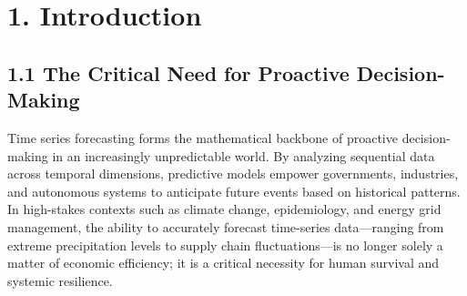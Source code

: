 \documentclass[11pt, letterpaper]{article}
\begin{document}
\begin{titlepage}
\end{titlepage}



\clearpage
\tableofcontents
\clearpage

\section{1. Introduction}
\label{sec:intro}

\subsection{1.1 The Critical Need for Proactive Decision-Making}
Time series forecasting forms the mathematical backbone of proactive decision-making in an increasingly unpredictable world. By analyzing sequential data across temporal dimensions, predictive models empower governments, industries, and autonomous systems to anticipate future events based on historical patterns. In high-stakes contexts such as climate change, epidemiology, and energy grid management, the ability to accurately forecast time-series data—ranging from extreme precipitation levels to supply chain fluctuations—is no longer solely a matter of economic efficiency; it is a critical necessity for human survival and systemic resilience.
\end{document}
